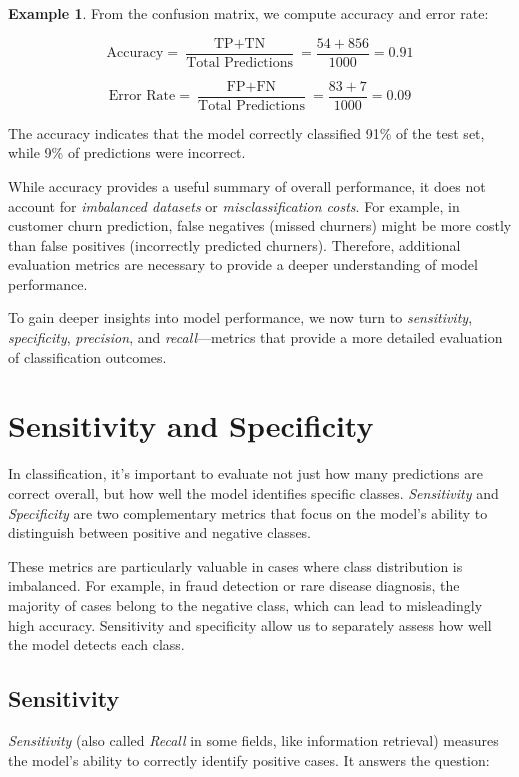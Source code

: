 \documentclass[
  11pt,
]{book}
\theoremstyle{definition}
\theoremstyle{definition}
\newtheorem{example}{Example}[chapter]
\theoremstyle{definition}
\theoremstyle{definition}
\theoremstyle{remark}
\begin{document}
\begin{example}
From the confusion matrix, we compute accuracy and error rate:

\[
\text{Accuracy} = \frac{\text{TP} + \text{TN}}{\text{Total Predictions}} = \frac{54 + 856}{1000} = 0.91
\]

\[
\text{Error Rate} = \frac{\text{FP} + \text{FN}}{\text{Total Predictions}} = \frac{83 + 7}{1000} = 0.09
\]

The accuracy indicates that the model correctly classified 91\% of the test set, while 9\% of predictions were incorrect.
\end{example}

While accuracy provides a useful summary of overall performance, it does not account for \emph{imbalanced datasets} or \emph{misclassification costs}. For example, in customer churn prediction, false negatives (missed churners) might be more costly than false positives (incorrectly predicted churners). Therefore, additional evaluation metrics are necessary to provide a deeper understanding of model performance.

To gain deeper insights into model performance, we now turn to \emph{sensitivity}, \emph{specificity}, \emph{precision}, and \emph{recall}---metrics that provide a more detailed evaluation of classification outcomes.

\section{Sensitivity and Specificity}\label{sensitivity-and-specificity}

In classification, it's important to evaluate not just how many predictions are correct overall, but how well the model identifies specific classes. \emph{Sensitivity} and \emph{Specificity} are two complementary metrics that focus on the model's ability to distinguish between positive and negative classes.

These metrics are particularly valuable in cases where class distribution is imbalanced. For example, in fraud detection or rare disease diagnosis, the majority of cases belong to the negative class, which can lead to misleadingly high accuracy. Sensitivity and specificity allow us to separately assess how well the model detects each class.

\subsection*{Sensitivity}\label{sensitivity}


\emph{Sensitivity} (also called \emph{Recall} in some fields, like information retrieval) measures the model's ability to correctly identify positive cases. It answers the question:
\end{document}
